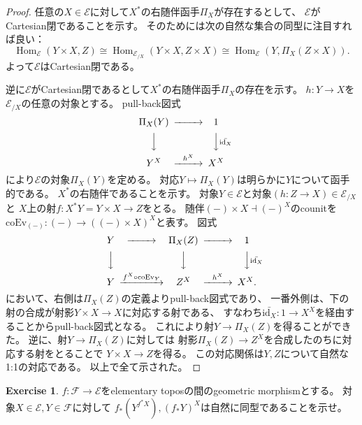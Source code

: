 \documentclass[uplatex]{jsarticle}
\theoremstyle{definition}
\newtheorem{prob}[prob]{Exercise}
\def\id{\mathrm{id}}
\DeclareMathOperator{\Hom}{Hom}
\def\mcE{\mathcal{E}}
\def\mcF{\mathcal{F}}
\begin{document}
\begin{proof}
  任意の\(X\in \mcE\)に対して\(X^*\)の右随伴函手\(\Pi_X\)が存在するとして、
  \(\mcE\)がCartesian閉であることを示す。
  そのためには次の自然な集合の同型に注目すれば良い：
  \[
  \Hom_{\mcE}(Y\times X,Z) \cong \Hom_{\mcE_{/X}}(Y\times X, Z\times X)
  \cong \Hom_{\mcE}(Y,\Pi_X(Z\times X)).
  \]
  よって\(\mcE\)はCartesian閉である。

  逆に\(\mcE\)がCartesian閉であるとして\(X^*\)の右随伴函手\(\Pi_X\)の存在を示す。
  \(h:Y\to X\)を\(\mcE_{/X}\)の任意の対象とする。
  pull-back図式
  \[
  \begin{CD}
    \Pi_X(Y) @>>> 1 \\
    @VVV @VV \bar{\id_X} V \\
    Y^X @> h^X >> X^X
  \end{CD}
  \]
  により\(\mcE\)の対象\(\Pi_X(Y)\)を定める。
  対応\(Y\mapsto \Pi_X(Y)\)は明らかに\(Y\)について函手的である。
  \(X^*\)の右随伴であることを示す。
  対象\(Y\in \mcE\)と対象\((h:Z\to X)\in \mcE_{/X}\)と
  \(X\)上の射\(f:X^*Y = Y\times X \to Z\)をとる。
  随伴\((-)\times X \dashv (-)^X\)のcounitを
  \(\mathrm{coEv}_{(-)}:(-)\to ((-)\times X)^X\)と表す。
  図式
  \[
  \begin{CD}
    Y @>>> \Pi_X(Z) @>>> 1 \\
    @VVV @VVV @VV \bar{\id_X} V \\
    Y @> f^X\circ \mathrm{coEv}_Y >> Z^X @> h^X >> X^X.
  \end{CD}
  \]
  において、右側は\(\Pi_X(Z)\)の定義よりpull-back図式であり、
  一番外側は、下の射の合成が射影\(Y\times X \to X\)に対応する射である、
  すなわち\(\bar{\id_X}:1\to X^X\)を経由することからpull-back図式となる。
  これにより射\(Y\to \Pi_X(Z)\)を得ることができた。
  逆に、射\(Y\to \Pi_X(Z)\)に対しては
  射影\(\Pi_X(Z)\to Z^X\)を合成したのちに対応する射をとることで
  \(Y\times X\to Z\)を得る。
  この対応関係は\(Y,Z\)について自然な1:1の対応である。
  以上で全て示された。
\end{proof}




\begin{prob}\label{prob: 1.9}
  \(f:\mcF\to \mcE\)をelementary toposの間のgeometric morphismとする。
  対象\(X\in \mcE, Y\in \mcF\)に対して
  \(f_*(Y^{f^*X}), (f_*Y)^X\)は自然に同型であることを示せ。
\end{prob}
\end{document}
